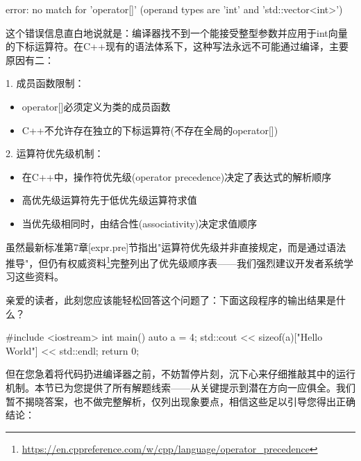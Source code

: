 \begin{shell}
error: no match for 'operator[]' (operand types are 'int' and 'std::vector<int>')
\end{shell}

这个错误信息直白地说就是：编译器找不到一个能接受整型参数并应用于int向量的下标运算符。在C++现有的语法体系下，这种写法永远不可能通过编译，主要原因有二：

1. 成员函数限制：

\begin{itemize}
\item 
operator[]必须定义为类的成员函数

\item 
C++不允许存在独立的下标运算符(不存在全局的operator[])
\end{itemize}

2. 运算符优先级机制：

\begin{itemize}
\item 
在C++中，操作符优先级(operator precedence)决定了表达式的解析顺序

\item 
高优先级运算符先于低优先级运算符求值

\item 
当优先级相同时，由结合性(associativity)决定求值顺序
\end{itemize}

虽然最新标准第7章[expr.pre]节指出"运算符优先级并非直接规定，而是通过语法推导"，但仍有权威资料\footnote{\url{https://en.cppreference.com/w/cpp/language/operator_precedence}}完整列出了优先级顺序表——我们强烈建议开发者系统学习这些资料。


亲爱的读者，此刻您应该能轻松回答这个问题了：下面这段程序的输出结果是什么？

\begin{cpp}
#include <iostream>
int main() {
  auto a = 4;
  std::cout << sizeof(a)["Hello World"] << std::endl;
  return 0;
}
\end{cpp}

但在您急着将代码扔进编译器之前，不妨暂停片刻，沉下心来仔细推敲其中的运行机制。本节已为您提供了所有解题线索——从关键提示到潜在方向一应俱全。我们暂不揭晓答案，也不做完整解析，仅列出现象要点，相信这些足以引导您得出正确结论：

